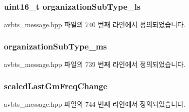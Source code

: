 \subsubsection[{\texorpdfstring{organization\+Sub\+Type\+\_\+ls}{organizationSubType_ls}}]{\setlength{\rightskip}{0pt plus 5cm}uint16\+\_\+t organization\+Sub\+Type\+\_\+ls\hspace{0.3cm}{\ttfamily [private]}}\hypertarget{class_follow_up_t_l_v_af5d5d56c0c74e3df1cae99986fafa44b}{}\label{class_follow_up_t_l_v_af5d5d56c0c74e3df1cae99986fafa44b}


avbts\+\_\+message.\+hpp 파일의 740 번째 라인에서 정의되었습니다.

\subsubsection[{\texorpdfstring{organization\+Sub\+Type\+\_\+ms}{organizationSubType_ms}}]{ organization\+Sub\+Type\+\_\+ms\hspace{0.3cm}{\ttfamily [private]}}\hypertarget{class_follow_up_t_l_v_aaad8acec162fb623707af758bc49f425}{}\label{class_follow_up_t_l_v_aaad8acec162fb623707af758bc49f425}


avbts\+\_\+message.\+hpp 파일의 739 번째 라인에서 정의되었습니다.

\subsubsection[{\texorpdfstring{scaled\+Last\+Gm\+Freq\+Change}{scaledLastGmFreqChange}}]{ scaled\+Last\+Gm\+Freq\+Change\hspace{0.3cm}{\ttfamily [private]}}\hypertarget{class_follow_up_t_l_v_a54e300bc3a15ef8e662516094953bad4}{}\label{class_follow_up_t_l_v_a54e300bc3a15ef8e662516094953bad4}


avbts\+\_\+message.\+hpp 파일의 744 번째 라인에서 정의되었습니다.


